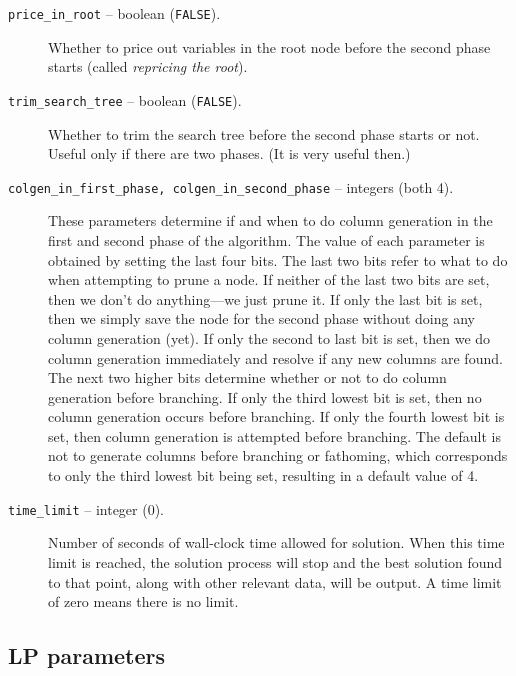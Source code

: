 \begin{description}
\item[{\tt price\_in\_root} -- boolean ({\tt FALSE}).]
Whether to price out variables in the root node before the second
phase starts (called {\em repricing the root}). 

\item[{\tt trim\_search\_tree} -- boolean ({\tt FALSE}).]
Whether to trim the search tree before the second phase starts or not. Useful
only if there are two phases. (It is very useful then.)

\item[{\tt colgen\_in\_first\_phase, colgen\_in\_second\_phase} --
integers (both 4).] These parameters determine if and when to do
column generation in the first and second phase of the algorithm. The
value of each parameter is obtained by setting the last four bits.
The last two bits refer to what to do when attempting to prune a node.
If neither of the last two bits are set, then we don't do
anything---we just prune it. If only the last bit is set, then we
simply save the node for the second phase without doing any column
generation (yet). If only the second to last bit is set, then we do
column generation immediately and resolve if any new columns are
found. The next two higher bits determine whether or not to do column
generation before branching. If only the third lowest bit is set, then no
column generation occurs before branching. If only the fourth lowest bit is
set, then column generation is attempted before branching. The default
is not to generate columns before branching or fathoming, which
corresponds to only the third lowest bit being set, resulting in a
default value of 4.

\item[{\tt time\_limit} -- integer (0).]
Number of seconds of wall-clock time allowed for solution. When this
time limit is reached, the solution process will stop and the best
solution found to that point, along with other relevant data, will be
output. A time limit of zero means there is no limit.

\end{description}

\subsection{LP parameters}

